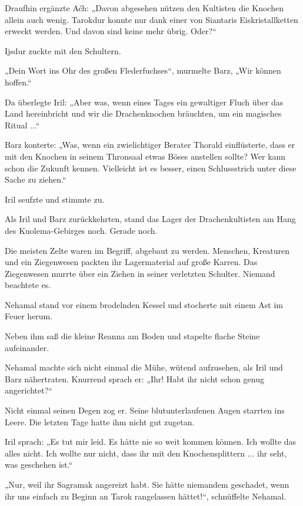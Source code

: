 Draufhin ergänzte Aćh: „Davon abgesehen nützen den Kultisten die Knochen allein auch wenig. Tarokdur konnte nur dank einer von Siantaris Eiskristallketten erweckt werden. Und davon sind keine mehr übrig. Oder?“

Ijsdur zuckte mit den Schultern.

„Dein Wort ins Ohr des großen Flederfuchses“, murmelte Barz, „Wir können hoffen.“

Da überlegte Iril: „Aber was, wenn eines Tages ein gewaltiger Fluch über das Land hereinbricht und wir die Drachenknochen bräuchten, um ein magisches Ritual ...“

Barz konterte: „Was, wenn ein zwielichtiger Berater Thorald einflüsterte, dass er mit den Knochen in seinem Thronsaal etwas Böses anstellen sollte? Wer kann schon die Zukunft kennen. Vielleicht ist es besser, einen Schlussstrich unter diese Sache zu ziehen.“

Iril seufzte und stimmte zu.\bigskip







Als Iril und Barz zurückkehrten, stand das Lager der Drachenkultisten am Hang des Kuolema-Gebirges noch. Gerade noch.

Die meisten Zelte waren im Begriff, abgebaut zu werden. Menschen, Kreaturen und ein Ziegenwesen packten ihr Lagermaterial auf große Karren. Das Ziegenwesen murrte über ein Ziehen in seiner verletzten Schulter. Niemand beachtete es.

Nehamal stand vor einem brodelnden Kessel und stocherte mit einem Ast im Feuer herum.

Neben ihm saß die kleine Reanna am Boden und stapelte flache Steine aufeinander.

Nehamal machte sich nicht einmal die Mühe, wütend aufzusehen, als Iril und Barz nähertraten. Knurrend sprach er: „Ihr! Habt ihr nicht schon genug angerichtet?“

Nicht einmal seinen Degen zog er. Seine blutunterlaufenen Augen starrten ins Leere. Die letzten Tage hatte ihm nicht gut zugetan.

Iril sprach: „Es tut mir leid. Es hätte nie so weit kommen können. Ich wollte das alles nicht. Ich wollte nur nicht, dass ihr mit den Knochensplittern ... ihr seht, was geschehen ist.“

„Nur, weil ihr Sagramak angereizt habt. Sie hätte niemandem geschadet, wenn ihr uns einfach zu Beginn an Tarok rangelassen hättet!“, schnüffelte Nehamal.

